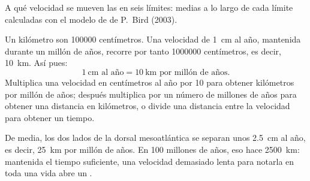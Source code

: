 \begin{omfigure}

{\small A qué velocidad se mueven las  en seis límites: medias a lo
largo de cada límite calculadas con el modelo de  de P.~Bird (2003).}
\end{omfigure}

\begin{method}\label{met:g7:plate-tectonics:convert}
Un kilómetro son \num{100000} centímetros. Una velocidad de \qty{1}{cm} al
año, mantenida durante un millón de años, recorre por tanto
\num{1000000} centímetros, es decir, \qty{10}{km}. Así pues:
\[
  1\ \text{cm al año} = 10\ \text{km por millón de años}.
\]
Multiplica una velocidad en centímetros al año por 10 para obtener
kilómetros por millón de años; después multiplica por un número de millones
de años para obtener una distancia en kilómetros, o divide una distancia
entre la velocidad para obtener un tiempo.
\end{method}

\begin{example}\label{ex:g7:plate-tectonics:atlantic}
De media, los dos lados de la dorsal mesoatlántica se separan unos
\qty{2.5}{cm} al año, es decir, \qty{25}{km} por millón de años. En 100
millones de años, eso hace \qty{2500}{km}: mantenida el tiempo suficiente,
una velocidad demasiado lenta para notarla en toda una vida abre un .
\end{example}

